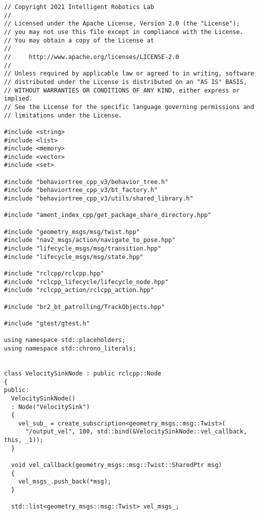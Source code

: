  \footnotesize
\begin{tcolorbox}[sharp corners, colframe=gray!80, colback=LightGray, left=0pt, top=0pt, bottom=0pt, title=\texttt{br2\_bt\_patrolling/tests/bt\_action\_test.cpp}]
  \begin{verbatim}
// Copyright 2021 Intelligent Robotics Lab
//
// Licensed under the Apache License, Version 2.0 (the "License");
// you may not use this file except in compliance with the License.
// You may obtain a copy of the License at
//
//     http://www.apache.org/licenses/LICENSE-2.0
//
// Unless required by applicable law or agreed to in writing, software
// distributed under the License is distributed on an "AS IS" BASIS,
// WITHOUT WARRANTIES OR CONDITIONS OF ANY KIND, either express or implied.
// See the License for the specific language governing permissions and
// limitations under the License.

#include <string>
#include <list>
#include <memory>
#include <vector>
#include <set>

#include "behaviortree_cpp_v3/behavior_tree.h"
#include "behaviortree_cpp_v3/bt_factory.h"
#include "behaviortree_cpp_v3/utils/shared_library.h"

#include "ament_index_cpp/get_package_share_directory.hpp"

#include "geometry_msgs/msg/twist.hpp"
#include "nav2_msgs/action/navigate_to_pose.hpp"
#include "lifecycle_msgs/msg/transition.hpp"
#include "lifecycle_msgs/msg/state.hpp"

#include "rclcpp/rclcpp.hpp"
#include "rclcpp_lifecycle/lifecycle_node.hpp"
#include "rclcpp_action/rclcpp_action.hpp"

#include "br2_bt_patrolling/TrackObjects.hpp"

#include "gtest/gtest.h"

using namespace std::placeholders;
using namespace std::chrono_literals;


class VelocitySinkNode : public rclcpp::Node
{
public:
  VelocitySinkNode()
  : Node("VelocitySink")
  {
    vel_sub_ = create_subscription<geometry_msgs::msg::Twist>(
      "/output_vel", 100, std::bind(&VelocitySinkNode::vel_callback, this, _1));
  }

  void vel_callback(geometry_msgs::msg::Twist::SharedPtr msg)
  {
    vel_msgs_.push_back(*msg);
  }

  std::list<geometry_msgs::msg::Twist> vel_msgs_;


\end{verbatim}
\end{tcolorbox}
